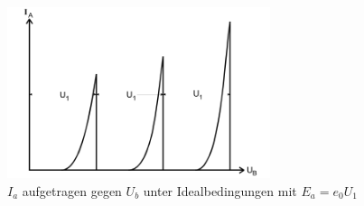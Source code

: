 \begin{figure}
  \center
  \includegraphics[height = 5cm]{./logos/ideal.PNG}
  \caption{$I_a$ aufgetragen gegen $U_b$ unter Idealbedingungen mit $E_a = e_0 U_1$ \cite{Anleitung}}
  \label{fig:ideal}
\end{figure}
